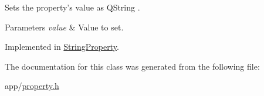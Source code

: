 Sets the property's value as Q\-String . 


\begin{DoxyParams}{Parameters}
{\em value} & Value to set. \\
\hline
\end{DoxyParams}


Implemented in \hyperlink{class_string_property_afebd41088d80724b87b2a1dcf41423ca}{String\-Property}.



The documentation for this class was generated from the following file\-:\begin{DoxyCompactItemize}
\item 
app/\hyperlink{property_8h}{property.\-h}\end{DoxyCompactItemize}
